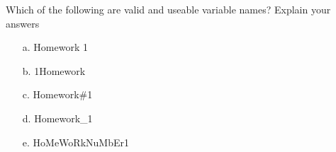 {Which of the following are valid and useable variable names?  Explain your answers

\begin{enumerate}
	\item[a.] Homework 1
	\item[b.] 1Homework
	\item[c.] Homework\#1
	\item[d.] Homework\_1
	\item[e.] HoMeWoRkNuMbEr1
\end{enumerate}
}
{}